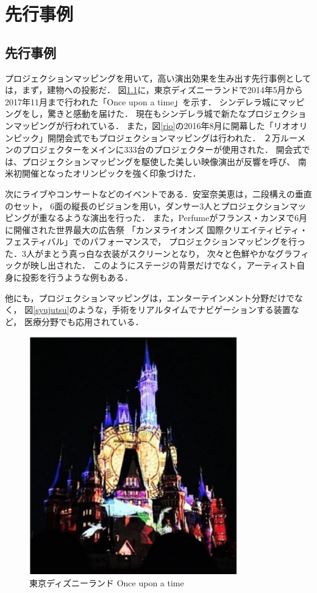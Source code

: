 \chapter{先行事例}
\thispagestyle{fancy}

\section{先行事例}
プロジェクションマッピングを用いて，高い演出効果を生み出す先行事例としては，まず，建物への投影だ．
図\ref{disney}に，東京ディズニーランドで2014年5月から2017年11月まで行われた「Once upon a time」を示す．
シンデレラ城にマッピングをし，驚きと感動を届けた．
現在もシンデレラ城で新たなプロジェクションマッピングが行われている\cite{once}．
また，図\ref{rio}の2016年8月に開幕した「リオオリンピック」開閉会式でもプロジェクションマッピングは行われた． 
２万ルーメンのプロジェクターをメインに333台のプロジェクターが使用された．
開会式では、プロジェクションマッピングを駆使した美しい映像演出が反響を呼び、
南米初開催となったオリンピックを強く印象づけた\cite{olympic}．

次にライブやコンサートなどのイベントである．安室奈美恵は，二段構えの垂直のセット，
6面の縦長のビジョンを用い，ダンサー3人とプロジェクションマッピングが重なるような演出を行った\cite{amuro}．
また，Perfumeがフランス・カンヌで6月に開催された世界最大の広告祭
「カンヌライオンズ 国際クリエイティビティ・フェスティバル」でのパフォーマンスで，
プロジェクションマッピングを行った．3人がまとう真っ白な衣装がスクリーンとなり，
次々と色鮮やかなグラフィックが映し出された\cite{kirameku}．
このようにステージの背景だけでなく，アーティスト自身に投影を行うような例もある．

他にも，プロジェクションマッピングは，エンターテインメント分野だけでなく，
図\ref{syujutsu}のような，手術をリアルタイムでナビゲーションする装置\cite{iryou}など，
医療分野でも応用されている．


\clearpage

\begin{figure}[t]
  \centering
  \includegraphics[width=9cm]{image/disney.png}
  \caption{東京ディズニーランド Once upon a time}
\label{disney}
\end{figure}

